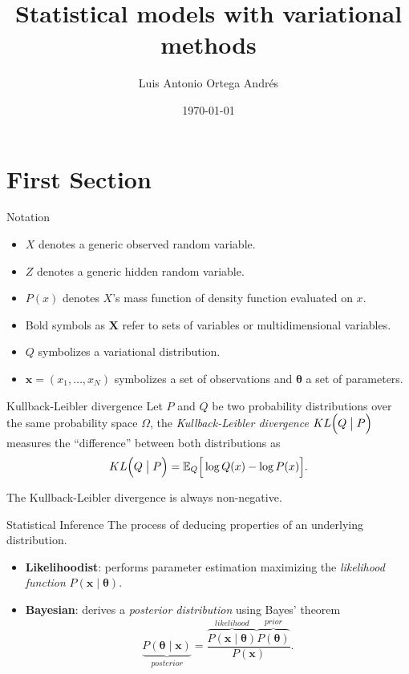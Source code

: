 \documentclass{beamer}
\title{Statistical models with variational methods}
\date{\today}
\author{Luis Antonio Ortega Andrés}
\institute{Here we go again...}
\newcommand{\bx}{\bm{x}}
\newcommand{\btheta}{\bm{\theta}}
\newcommand\E[2]{\mathbb{E}_{#1}\Big[#2\Big]}
\newcommand\KL[2]{KL\Big(#1 \bigm| #2\Big)}
\begin{document}
  \maketitle
  \section{First Section}

  \begin{frame}{Notation}
    \begin{itemize}
      \item \(X\) denotes a generic observed random variable.
      \item \(Z\) denotes a generic hidden random variable.
      \item \(P(x)\) denotes \(X\)'s mass function of density function evaluated on \(x\).
      \item Bold symbols as \(\bm{X}\) refer to sets of variables or multidimensional variables.
      \item \(Q\) symbolizes a variational distribution.
      \item \(\bx = (x_{1},\dots,x_{N})\) symbolizes a set of observations and \(\btheta\) a set of parameters.
    \end{itemize}
  \end{frame}

  \begin{frame}{Kullback-Leibler divergence}
    Let \(P\) and \(Q\) be two probability distributions over the same probability space \( \Omega \), the \emph{Kullback-Leibler divergence}
    \(\KL{Q}{P}\) measures the ``difference'' between both distributions as
    \[
      \KL{Q}{P} = \E{Q}{\log Q(x) - \log P(x)}.
    \]
    \begin{shaded}
      The Kullback-Leibler divergence is always non-negative.
    \end{shaded}
  \end{frame}

  \begin{frame}{Statistical Inference}
    The process of deducing properties of an underlying distribution.

    \begin{itemize}
      \item \textbf{Likelihoodist}: performs parameter estimation maximizing the \emph{likelihood function} \(P(\bx \mid \btheta)\).
      \item \textbf{Bayesian}: derives a \emph{posterior distribution} using Bayes' theorem
        \[
        \underbrace{P(\btheta \mid \bx)}_{posterior} = \frac{\overbrace{P(\bx \mid \btheta)}^{likelihood}\overbrace{P(\btheta)}^{prior}}{P(\bx)}.
        \]
    \end{itemize}
  \end{frame}
\end{document}
